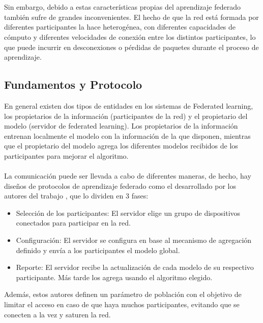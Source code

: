 \\ \\
Sin embargo, debido a estas características propias del aprendizaje federado también sufre de grandes inconvenientes. El hecho de que la red está formada por diferentes participantes la hace heterogénea, con diferentes capacidades de cómputo y diferentes velocidades de conexión entre los distintos participantes, lo que puede incurrir en desconexiones o pérdidas de paquetes durante el proceso de aprendizaje.
\subsection{Fundamentos y Protocolo}
En general existen dos tipos de entidades en los sistemas de Federated learning, los propietarios de la información (participantes de la red) y el propietario del modelo (servidor de federated learning). Los propietarios de la información entrenan localmente el modelo con la información de la que disponen, mientras que el propietario del modelo agrega los diferentes modelos recibidos de los participantes para mejorar el algoritmo. 
\\ \\
La comunicación puede ser llevada a cabo de diferentes maneras, de hecho, hay diseños de protocolos de aprendizaje federado como el desarrollado por los autores del trabajo \autocite{bonawitzFederatedLearningScale2019}, que lo dividen en 3 fases:

\begin{itemize}
    \item Selección de los participantes: El servidor elige un grupo de dispositivos conectados para participar en la red.
    \item Configuración: El servidor se configura en base al mecanismo de agregación definido y envía a los participantes el modelo global.
    \item Reporte: El servidor recibe la actualización de cada modelo de su respectivo participante. Más tarde los agrega usando el algoritmo elegido.
\end{itemize}

Además, estos autores definen un parámetro de población con el objetivo de limitar el acceso en caso de que haya muchos participantes, evitando que se conecten a la vez y saturen la red.

